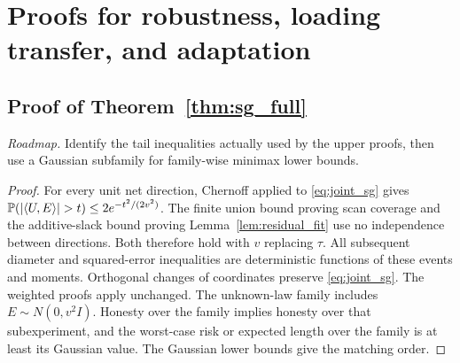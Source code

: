 \section{Proofs for robustness, loading transfer, and adaptation}\label{app:robust_adaptive}

\subsection{Proof of Theorem~\ref{thm:sg_full}}
\noindent\emph{Roadmap.} Identify the tail inequalities actually used by the upper proofs, then use a Gaussian subfamily for family-wise minimax lower bounds.
\begin{proof}
For every unit net direction, Chernoff applied to \eqref{eq:joint_sg} gives
$\PP(|\ip UE|>t)\le2e^{-t^2/(2v^2)}$.
The finite union bound proving scan coverage and the additive-slack bound proving Lemma~\ref{lem:residual_fit} use no independence between directions. Both therefore hold with $v$ replacing $\tau$. All subsequent diameter and squared-error inequalities are deterministic functions of these events and moments. Orthogonal changes of coordinates preserve \eqref{eq:joint_sg}. The weighted proofs apply unchanged. The unknown-law family includes $E\sim N(0,v^2I)$. Honesty over the family implies honesty over that subexperiment, and the worst-case risk or expected length over the family is at least its Gaussian value. The Gaussian lower bounds give the matching order.
\end{proof}

